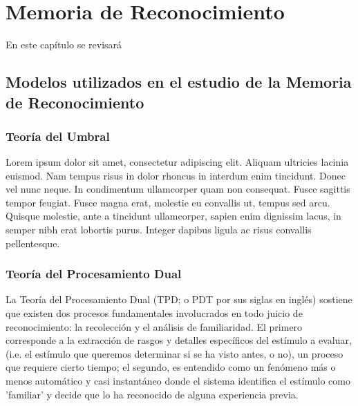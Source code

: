 
\chapter{Memoria de Reconocimiento} %

\label{Cap_RM} %

En este capítulo se revisará 

\section{Modelos utilizados en el estudio de la Memoria de Reconocimiento}

\subsection{Teoría del Umbral}

Lorem ipsum dolor sit amet, consectetur adipiscing elit. Aliquam ultricies lacinia euismod. Nam tempus risus in dolor rhoncus in interdum enim tincidunt. Donec vel nunc neque. In condimentum ullamcorper quam non consequat. Fusce sagittis tempor feugiat. Fusce magna erat, molestie eu convallis ut, tempus sed arcu. Quisque molestie, ante a tincidunt ullamcorper, sapien enim dignissim lacus, in semper nibh erat lobortis purus. Integer dapibus ligula ac risus convallis pellentesque.

\subsection{Teoría del Procesamiento Dual}

La Teoría del Procesamiento Dual (TPD; o PDT por sus siglas en inglés) sostiene que existen dos procesos fundamentales involucrados en todo juicio de reconocimiento: la recolección y el análisis de familiaridad. El primero corresponde a la extracción de rasgos y detalles específicos del estímulo a evaluar, (i.e. el estímulo que queremos determinar si se ha visto antes, o no), un proceso que requiere cierto tiempo; el segundo, es entendido como un fenómeno más o menos automático y casi instantáneo donde el sistema identifica el estímulo como 'familiar' y decide que lo ha reconocido de alguna experiencia previa. 

